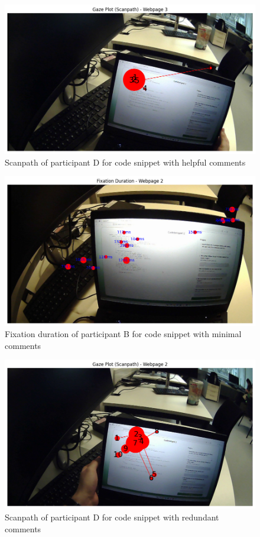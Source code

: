 \begin{figure} [H]
  \centering
  \includegraphics[scale=0.6]{figures/h-com.png}
  \caption{Scanpath of participant D for code snippet with helpful comments }
  \label{fig:AnhangsChor}
\end{figure}

\begin{figure} [H]
  \centering
  \includegraphics[scale=0.6]{figures/min-com.png}
  \caption{Fixation duration of participant B for code snippet with minimal comments}
  \label{fig:AnhangsChor}
\end{figure}

\begin{figure} [H]
  \centering
  \includegraphics[scale=0.6]{figures/redun-com.png}
  \caption{Scanpath of  participant D for code snippet with redundant comments}
  \label{fig:AnhangsChor}
\end{figure}



